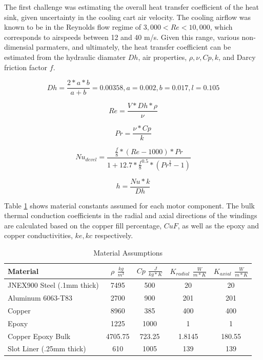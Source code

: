 \documentclass[]{aiaa-tc}%
\begin{document}
The first challenge was estimating the overall heat transfer coefficient of the heat sink, given uncertainty in the cooling cart air velocity. The cooling airflow was known to be in the Reynolds flow regime of $3,000<Re<10,000$, which corresponds to airspeeds between 12 and 40 m/s. Given this range, various non-dimensial parmaters, and ultimately, the heat transfer coefficient can be estimated from the hydraulic diamater $Dh$, air properties, $\rho, \nu, Cp, k$, and Darcy friction factor $f$.

\begin{equation}
Dh = \frac{2*a*b}{a+b} = 0.00358,
a = 0.002, b = 0.017, l = 0.105
\label{eq:Dh}
\end{equation}

\begin{equation}
Re = \frac{V*Dh*\rho}{\nu}
\label{eq:Re}
\end{equation}

\begin{equation}
Pr = \frac{\nu*Cp}{k}
\label{eq:Pr}
\end{equation}

\begin{equation}
Nu_{devel} = \frac{\frac{f}{8}*(Re-1000)*Pr}{1+12.7*\frac{f}{8}^{0.5}*(Pr^{\frac{2}{3}}-1)}
\label{eq:Nu}
\end{equation}

\begin{equation}
h = \frac{Nu*k}{Dh}
\label{eq:h}
\end{equation}

Table \ref{tab:COMSOL} shows material constants assumed for each motor component. The bulk thermal conduction coefficients in the radial and axial directions of the windings are calculated based on the copper fill percentage, $CuF$, as well as the epoxy and copper conductivities, $ke, kc$ respectively.

\begin{table}[hbt!]
\caption{\label{tab:COMSOL} Material Assumptions}
\centering
\begin{tabular}{lcccc}
\\
Material  & $\rho$ $\frac{kg}{m^3}$ & $Cp$ $\frac{J}{kg*K}$  & $K_{radial}$ $\frac{W}{m*K}$ & $K_{axial}$ $\frac{W}{m*K}$\\\hline
JNEX900 Steel (.1mm thick) & 7495& 500& 20& 20\\
Aluminum 6063-T83   & 2700  & 900 & 201& 201  \\
Copper & 8960 & 385 & 400& 400\\
Epoxy & 1225 & 1000 & 1& 1 \\
Copper Epoxy Bulk & 4705.75 & 723.25 & 1.8145 & 180.55\\
Slot Liner (.25mm thick) & 610 &1005&139 & 139\\\hline
\end{tabular}
\end{table}
\end{document}
